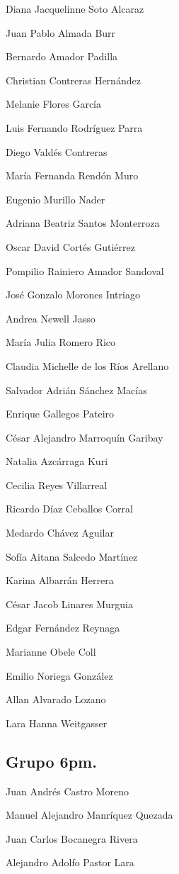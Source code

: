 \documentclass[12pt,halfline,a4paper,]{ouparticle}
\begin{document}
Diana Jacquelinne Soto Alcaraz

Juan Pablo Almada Burr

Bernardo Amador Padilla

Christian Contreras Hernández

Melanie Flores García

Luis Fernando Rodríguez Parra

Diego Valdés Contreras

María Fernanda Rendón Muro

Eugenio Murillo Nader

Adriana Beatriz Santos Monterroza

Oscar David Cortés Gutiérrez

Pompilio Rainiero Amador Sandoval

José Gonzalo Morones Intriago

Andrea Newell Jasso

María Julia Romero Rico

Claudia Michelle de los Ríos Arellano

Salvador Adrián Sánchez Macías

Enrique Gallegos Pateiro

César Alejandro Marroquín Garibay

Natalia Azcárraga Kuri

Cecilia Reyes Villarreal

Ricardo Díaz Ceballos Corral

Medardo Chávez Aguilar

Sofía Aitana Salcedo Martínez

Karina Albarrán Herrera

César Jacob Linares Murguia

Edgar Fernández Reynaga

Marianne Obele Coll

Emilio Noriega González

Allan Alvarado Lozano

Lara Hanna Weitgasser

\hypertarget{grupo-6pm.}{%
\subsection{Grupo 6pm.}\label{grupo-6pm.}}

Juan Andrés Castro Moreno

Manuel Alejandro Manríquez Quezada

Juan Carlos Bocanegra Rivera

Alejandro Adolfo Pastor Lara
\end{document}
